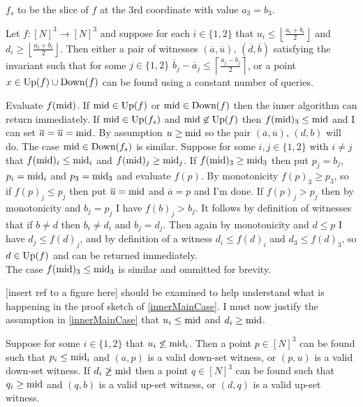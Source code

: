 $f_s$ to be the slice of $f$ at the $3$rd coordinate with value $a_3 = b_3$.
\begin{lemma}\label{innerMainCase}
  Let $f : [N]^3 \to [N]^3$ and
  suppose for each $i \in \{1, 2\}$ that $u_i \leq \left \lfloor \frac{a_i + b_i}{2} \right \rfloor$
  and $d_i \geq \left \lfloor \frac{a_i + b_i}{2} \right\rfloor$.
  Then either a pair of witnesses $(\overline{a}, \overline{u})$, $(\overline{d}, \overline{b})$ satisfying the invariant
  such that for some $j \in \{1, 2\}$ $\overline{b}_j - \overline{a}_j \leq \left\lceil \frac{a_j - b_j}{2}\right \rceil$, 
  or a point $x \in \text{Up}(f) \cup \text{Down}(f)$
  can be found using a constant
  number of queries. 
\end{lemma}
\begin{sproof}
  Evaluate $f(\text{mid})$. If $\text{mid} \in \text{Up}(f)$ or
  $\text{mid} \in \text{Down}(f)$ then the inner algorithm can return immediately. If $\text{mid} \in \text{Up}(f_s)$ and $\text{mid} \not\in \text{Up}(f)$
  then $f(\text{mid})_3 \leq \text{mid}$ and I can set
  $\overline{a} = \overline{u} = \text{mid}$. By assumption $u \geq \text{mid}$ so the pair $(\overline{a}, \overline{u})$, $(d, b)$ will do.
  The case $\text{mid} \in \text{Down}(f_s)$ is similar.
  Suppose for some $i, j \in \{1, 2\}$ with $i \neq j$ that $f(\text{mid})_i \leq \text{mid}_i$ and $f(\text{mid})_j \geq \text{mid}_j$.
  If $f(\text{mid})_3 \geq \text{mid}_3$ then put $p_j = b_j$, $p_i = \text{mid}_i$ and $p_3 = \text{mid}_3$ and evaluate $f(p)$.  
  By monotonicity $f(p)_3 \geq p_3$, so if $f(p)_j \leq p_j$ then put $\overline{u} = \text{mid}$ and $\overline{a} = p$ and I'm done.
  If $f(p)_j > p_j$ then by monotonicity and $b_j = p_j$ I have $f(b)_j > b_j$. It follows by definition of witnesses that if $b \neq d$ then 
  $b_i \neq d_i$ and $b_j = d_j$. Then again by monotonicity and $d \leq p$ I have $d_j \leq f(d)_j$, and by definition
  of a witness $d_i \leq f(d)_i$ and $d_3 \leq f(d)_3$, so $d \in \text{Up}(f)$ and can be returned immediately. \\
  The case $f(\text{mid})_3 \leq \text{mid}_3$ is similar and ommitted for brevity.
\end{sproof}
[insert ref to a figure here] should be examined to help understand what is happening in the proof sketch of \cref{innerMainCase}.
I must now justify the assumption in \cref{innerMainCase} that 
$u_i \leq \text{mid}$ and $d_i \geq \text{mid}$.
\begin{lemma}\label{innerOtherCase}
  Suppose for some $i \in \{1, 2\}$ that $u_i \not\leq \text{mid}_i$.
  Then a point $p \in [N]^3$ can be found such that $p_i \leq \text{mid}_i$ and $(a, p)$ is a valid down-set
  witness, or $(p, u)$ is a valid down-set witness. 
  If $d_i \not\geq \text{mid}$ then a point $q \in [N]^3$ can be found such that $q_i \geq \text{mid}$
  and $(q, b)$ is a valid up-set
  witness, or $(d, q)$ is a valid up-set witness. 
\end{lemma}
